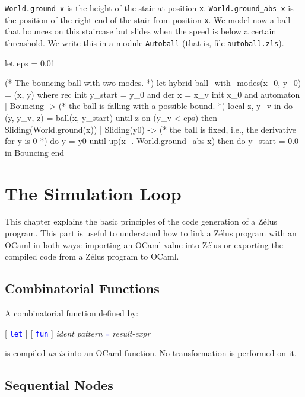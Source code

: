 \documentclass[11pt,titlepage,twoside]{report}
\newcommand{\zelus}{{\sf Z\'elus}}
\newcommand{\ocaml}{{\sf OCaml}}
\newcommand{\term}[1]{\textcolor{Blue}{\tt #1}}
\newcommand{\nterm}[1]{\textcolor{BrickRed}{\it #1}}
\newcommand{\term}[1]{{\tt #1}}
\newcommand{\nterm}[1]{{\em #1}}
\begin{document}
\verb-World.ground x- is the height of the stair at position
\verb-x-. \verb-World.ground_abs x- is the position of the right end of the
stair from position \verb-x-. We model now a ball that bounces on this
staircase but slides when the speed is below a certain threashold. We
write this in a module \verb-Autoball- (that is, file
\verb-autoball.zls-).
\begin{chklisting}
let eps = 0.01

(* The bouncing ball with two modes. *)
let hybrid ball_with_modes(x_0, y_0) = (x, y) where
  rec init y_start = y_0 
  and der x = x_v init x_0
  and automaton
      | Bouncing ->
         (* the ball is falling with a possible bound. *)
         local z, y_v in
         do (y, y_v, z) = ball(x, y_start)
         until z on (y_v < eps) then Sliding(World.ground(x))
      | Sliding(y0) ->
         (* the ball is fixed, i.e., the derivative for y is 0 *)
         do 
           y = y0 
         until up(x -. World.ground_abs x)
         then do y_start = 0.0 in Bouncing
      end
\end{chklisting}

\chapter{The Simulation Loop\label{simulation-loop}} %

This chapter explains the basic principles of the code generation of a \zelus{}
program. This part is useful to understand how to link a \zelus{} program
with an \ocaml{} in both ways: importing an \ocaml{} value into \zelus{}
or exporting the compiled code from a \zelus{} program to \ocaml.

\section{Combinatorial Functions\label{combfuncs}} %

A combinatorial function defined by:
\begin{center}
  [ \term{let} ] [ \term{fun} ] \nterm{ident} \nterm{pattern} \term{=}
  \nterm{result-expr}
\end{center}

is compiled \emph{as is} into an \ocaml{} function. No transformation is
performed on it.

\section{Sequential Nodes\label{seqnodes}} %
\end{document}
